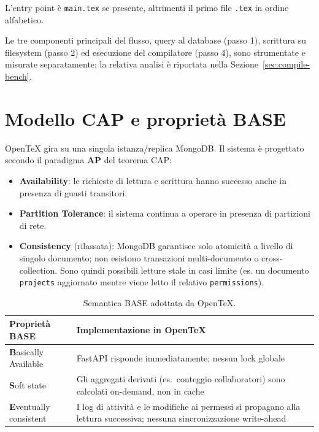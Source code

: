\documentclass[11pt,a4paper]{article}
\begin{document}
L'entry point è \texttt{main.tex} se presente, altrimenti il primo file \texttt{.tex} in ordine alfabetico.

Le tre componenti principali del flusso, query al database (passo 1), scrittura su filesystem (passo 2) ed esecuzione del compilatore (passo 4), sono strumentate e misurate separatamente; la relativa analisi è riportata nella Sezione~\ref{sec:compile-bench}.

\section{Modello CAP e proprietà BASE}
\label{sec:cap}

OpenTeX gira su una singola istanza/replica MongoDB. Il sistema è progettato secondo il paradigma \textbf{AP} del teorema CAP:

\begin{itemize}[leftmargin=2.2em]
  \item \textbf{Availability}: le richieste di lettura e scrittura hanno successo anche in presenza di guasti transitori.
  \item \textbf{Partition Tolerance}: il sistema continua a operare in presenza di partizioni di rete.
  \item \textbf{Consistency} (rilassata): MongoDB garantisce solo atomicità a livello di singolo documento; non esistono transazioni multi-documento o cross-collection. Sono quindi possibili letture stale in casi limite (es. un documento \texttt{projects} aggiornato mentre viene letto il relativo \texttt{permissions}).
\end{itemize}

\begin{table}[h!]
\centering
\begin{tabular}{@{}p{3.4cm}p{8.6cm}@{}}
\toprule
\textbf{Proprietà BASE} & \textbf{Implementazione in OpenTeX} \\
\midrule
\textbf{B}asically Available & FastAPI risponde immediatamente; nessun lock globale \\
\textbf{S}oft state & Gli aggregati derivati (es.\ conteggio collaboratori) sono calcolati on-demand, non in cache \\
\textbf{E}ventually \newline consistent & I log di attività e le modifiche ai permessi si propagano alla lettura successiva; nessuna sincronizzazione write-ahead \\
\bottomrule
\end{tabular}
\caption{Semantica BASE adottata da OpenTeX.}
\end{table}
\end{document}
